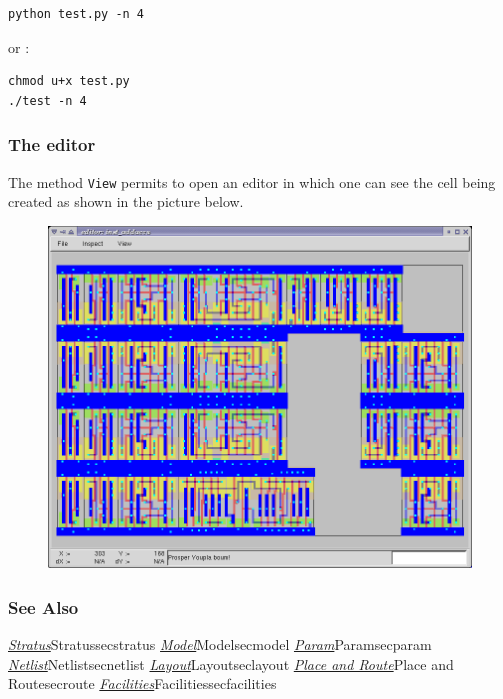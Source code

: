 \begin{verbatim}
python test.py -n 4
\end{verbatim}
\indent or :
\begin{verbatim}
chmod u+x test.py
./test -n 4
\end{verbatim}

\subsubsection{The editor}

The method \verb-View- permits to open an editor in which one can see the cell being created as shown in the picture below.
\begin{figure}[hbp]
\centering
\includegraphics[width=1\textwidth]{images/editor.png}
\end{figure}


\subsubsection{See Also}

\hyperref[ref]{\emph{Stratus}}{}{Stratus}{secstratus}
\hyperref[ref]{\emph{Model}}{}{Model}{secmodel}
\hyperref[ref]{\emph{Param}}{}{Param}{secparam}
\hyperref[ref]{\emph{Netlist}}{}{Netlist}{secnetlist}
\hyperref[ref]{\emph{Layout}}{}{Layout}{seclayout}
\hyperref[ref]{\emph{Place and Route}}{}{Place and Route}{secroute}
\hyperref[ref]{\emph{Facilities}}{}{Facilities}{secfacilities}
